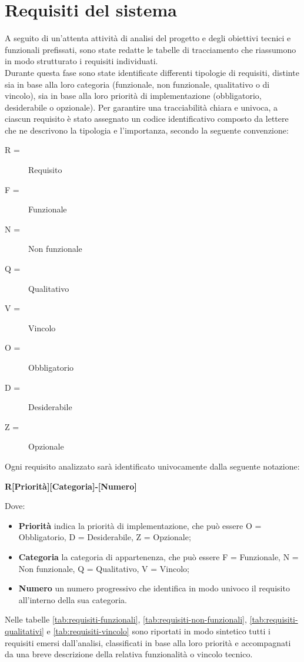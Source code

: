\section{Requisiti del sistema}

A seguito di un'attenta attività di analisi del progetto e degli obiettivi tecnici e funzionali prefissati, sono state redatte le tabelle di tracciamento che riassumono in modo strutturato i requisiti individuati. \\
Durante questa fase sono state identificate differenti tipologie di requisiti, distinte sia in base alla loro categoria (funzionale, non funzionale, qualitativo o di vincolo), sia in base alla loro priorità di implementazione (obbligatorio, desiderabile o opzionale).
Per garantire una tracciabilità chiara e univoca, a ciascun requisito è stato assegnato un codice identificativo composto da lettere che ne descrivono la tipologia e l'importanza, secondo la seguente convenzione:
\begin{description}
	\item [R =] Requisito
	\item [F =] Funzionale
    \item [N =] Non funzionale
    \item [Q =] Qualitativo
    \item [V =] Vincolo
    \item [O =] Obbligatorio
    \item [D =] Desiderabile
    \item [Z =] Opzionale
\end{description}

\newpage

Ogni requisito analizzato sarà identificato univocamente dalla seguente notazione:
\begin{center}
    \textbf{R[Priorità][Categoria]-[Numero]}
\end{center}
Dove:

\begin{itemize}
    \item \textbf{Priorità} indica la priorità di implementazione, che può essere O = Obbligatorio, D = Desiderabile, Z = Opzionale;
    \item \textbf{Categoria} la categoria di appartenenza, che può essere F = Funzionale, N = Non funzionale, Q = Qualitativo, V = Vincolo;
    \item \textbf{Numero} un numero progressivo che identifica in modo univoco il requisito all'interno della sua categoria.
\end{itemize}
Nelle tabelle \ref{tab:requisiti-funzionali}, \ref{tab:requisiti-non-funzionali}, \ref{tab:requisiti-qualitativi} e \ref{tab:requisiti-vincolo} sono riportati in modo sintetico tutti i requisiti emersi dall'analisi, classificati in base alla loro priorità e accompagnati da una breve descrizione della relativa funzionalità o vincolo tecnico. \\


